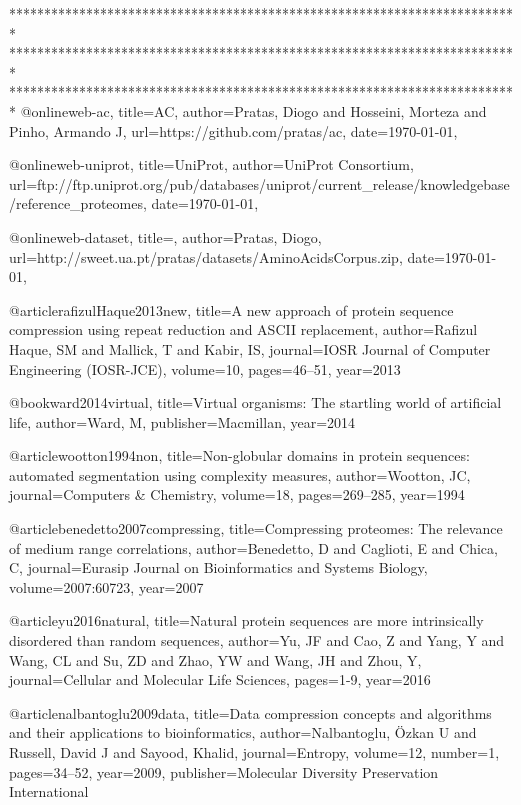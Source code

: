 *************************************************************************
*************************************************************************
*************************************************************************
@online{web-ac,
  title={{AC}},
  author={Pratas, Diogo and Hosseini, Morteza and Pinho, Armando J},
  url={https://github.com/pratas/ac},
  date={\today},
}

@online{web-uniprot,
  title={{UniProt}},
  author={UniProt Consortium},
  url={ftp://ftp.uniprot.org/pub/databases/uniprot/current\_release/knowledgebase/reference\_proteomes},
  date={\today},
}

@online{web-dataset,
  title={},
  author={Pratas, Diogo},
  url={http://sweet.ua.pt/pratas/datasets/AminoAcidsCorpus.zip},
  date={\today},
}

@article{rafizulHaque2013new,
  title={A new approach of protein sequence compression using repeat reduction and {ASCII} replacement},
  author={Rafizul Haque, SM and Mallick, T and Kabir, IS},
  journal={IOSR Journal of Computer Engineering (IOSR-JCE)},
  volume={10},
  pages={46--51},
  year={2013}
}

@book{ward2014virtual,
  title={Virtual organisms: The startling world of artificial life},
  author={Ward, M},
  publisher={Macmillan},
  year={2014}
}

@article{wootton1994non,
  title={Non-globular domains in protein sequences: automated segmentation using complexity measures},
  author={Wootton, JC},
  journal={Computers \& Chemistry},
  volume={18},
  pages={269--285},
  year={1994}
}

@article{benedetto2007compressing,
  title={Compressing proteomes: The relevance of medium range correlations},
  author={Benedetto, D and Caglioti, E and Chica, C},
  journal={Eurasip Journal on Bioinformatics and Systems Biology},
  volume={2007:60723},
  year={2007}
}

@article{yu2016natural,
  title={Natural protein sequences are more intrinsically disordered than random sequences},
  author={Yu, JF and Cao, Z and Yang, Y and Wang, CL and Su, ZD and Zhao, YW and Wang, JH and Zhou, Y},
  journal={Cellular and Molecular Life Sciences},
  pages={1-9},
  year={2016}
}

@article{nalbantoglu2009data,
  title={Data compression concepts and algorithms and their applications to bioinformatics},
  author={Nalbantoglu, {\"O}zkan U and Russell, David J and Sayood, Khalid},
  journal={Entropy},
  volume={12},
  number={1},
  pages={34--52},
  year={2009},
  publisher={Molecular Diversity Preservation International}
}


